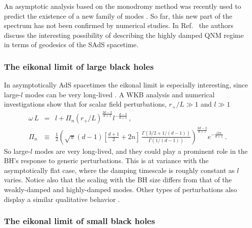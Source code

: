 \documentclass[]{iopart}
\def\beq{\begin{eqnarray}}
\def\eeq{\end{eqnarray}}
\def\f{\frac}
\def\nn{\nonumber}
\def\f{\frac}
\begin{document}
An asymptotic analysis based on the monodromy method was recently used to
predict the existence of a new family of modes \cite{Daghigh:2008jz}. So far,
this new part of the spectrum has not been confirmed by numerical studies.  In
Ref.~\cite{Amado:2008hw} the authors discuss the interesting possibility of
describing the highly damped QNM regime in terms of geodesics of the SAdS
spacetime.

\subsubsection*{The eikonal limit of large black holes}

In asymptotically AdS spacetimes the eikonal limit is especially interesting,
since large-$l$ modes can be very long-lived
\cite{Horowitz:1999jd,Festuccia:2008zx}. A WKB analysis
\cite{Festuccia:2008zx} and numerical investigations \cite{Morgan:2009vg} show
that for scalar field perturbations, $r_+/L\gg 1$ and $l\gg 1$
%
\beq
\omega\,L&=&
l+ 
\Pi_n 
\left (r_+/L\right )^
{\frac{2d-2}{d+1}} l^{-\frac{d-3}{d+1}}\,,
\label{eikonalads}\\
%
\Pi_n &\equiv & 
\f{1}{2}\left (\sqrt{\pi}(d-1)\left [\f{d+1}{2}+2n\right ]\,
\frac{\Gamma\left(3/2+1/(d-1)\right)}
{\Gamma\left(1/(d-1)\right)}\right )
^{\frac{2d-2}{d+1}}e^{-\frac{i2\pi}{d+1}}\,.
\nn
\eeq
%
So large-$l$ modes are very long-lived, and they could play a prominent role
in the BH's response to generic perturbations. This is at variance with the
asymptotically flat case, where the damping timescale is roughly constant as
$l$ varies. Notice also that the scaling with the BH size differs from that of
the weakly-damped and highly-damped modes. Other types of perturbations also
display a similar qualitative behavior \cite{Morgan:2009vg}.

\subsubsection*{The eikonal limit of small black holes}
\end{document}
